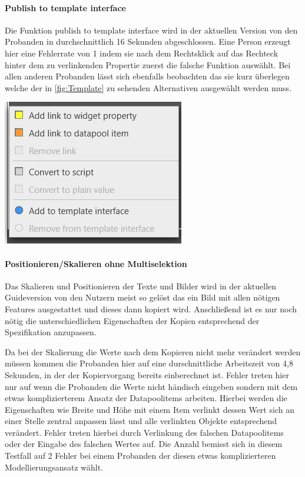 \paragraph{Publish to template interface}
Die Funktion \glqq publish to template interface\grqq{} wird in der aktuellen Version von den Probanden in durchschnittlich 16 Sekunden abgeschlossen.
Eine Person erzeugt hier eine Fehlerrate von 1 indem sie nach dem Rechtsklick auf das Rechteck hinter dem zu verlinkenden Propertie zuerst die falsche Funktion auswählt.
Bei allen anderen Probanden lässt sich ebenfalls beobachten das sie kurz überlegen welche der in \ref{fig:Template} zu sehenden Alternativen ausgewählt werden muss.
\begin{center}
  \includegraphics[scale= 0.8]{figures/Template.PNG}
  \label{fig:Template}
\end{center}

\paragraph{Positionieren/Skalieren ohne Multiselektion}
Das Skalieren und Positionieren der Texte und Bilder wird in der aktuellen Guideversion von den Nutzern meist so gelöst das ein Bild mit allen nötigen Features ausgestattet und dieses dann kopiert wird.
Anschließend ist es nur noch nötig die unterschiedlichen Eigenschaften der Kopien entsprechend der Spezifikation anzupassen.

Da bei der Skalierung die Werte nach dem Kopieren nicht mehr verändert werden müssen kommen die Probanden hier auf eine durschnittliche Arbeitszeit von 4,8 Sekunden, in der der Kopiervorgang bereits einberechnet ist.
Fehler treten hier nur auf wenn die Probanden die Werte nicht händisch eingeben sondern mit dem etwas komplizierterem Ansatz der Datapoolitems arbeiten.
Hierbei werden die Eigenschaften wie Breite und Höhe mit einem Item verlinkt dessen Wert sich an einer Stelle zentral anpassen lässt und alle verlinkten Objekte entsprechend verändert.
Fehler treten hierbei durch Verlinkung des falschen Datapoolitems oder der Eingabe des falschen Wertes auf.
Die Anzahl bemisst sich in diesem Testfall auf 2 Fehler bei einem Probanden der diesen etwas komplizierteren Modellierungsansatz wählt.

